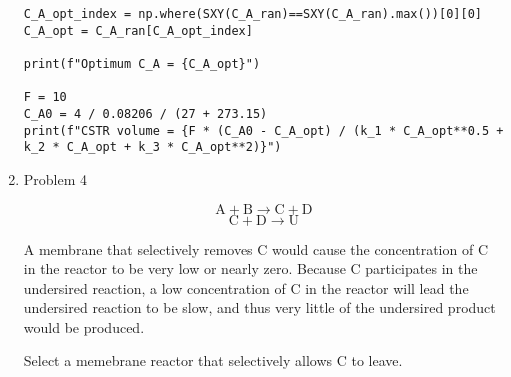 \documentclass[12pt]{article}
\begin{document}
\begin{enumerate}
\begin{verbatim}
C_A_opt_index = np.where(SXY(C_A_ran)==SXY(C_A_ran).max())[0][0]
C_A_opt = C_A_ran[C_A_opt_index]

print(f"Optimum C_A = {C_A_opt}")

F = 10 
C_A0 = 4 / 0.08206 / (27 + 273.15)
print(f"CSTR volume = {F * (C_A0 - C_A_opt) / (k_1 * C_A_opt**0.5 + k_2 * C_A_opt + k_3 * C_A_opt**2)}")
\end{verbatim}
    
\newpage
    \item Problem 4
    
    \[
        \mathrm{A} + \mathrm{B} \rightarrow \mathrm{C} + \mathrm{D} 
    \]
    \[
        \mathrm{C} + \mathrm{D} \rightarrow \mathrm{U} 
    \]

    A membrane that selectively removes C would cause the concentration of C in the reactor to be very low or nearly zero. Because C participates in the undersired reaction, a low concentration of C in the reactor will lead the undersired reaction to be slow, and thus very little of the undersired product would be produced.

    Select a memebrane reactor that selectively allows C to leave.
    

\end{enumerate}
\end{document}
